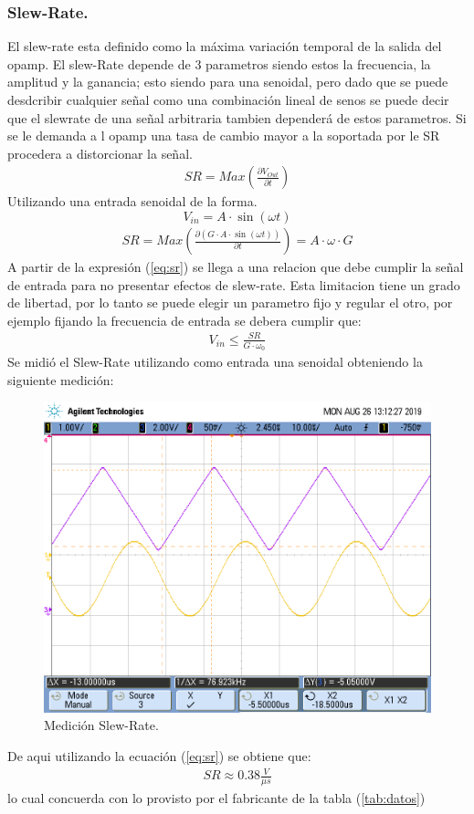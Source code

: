 \subsubsection{Slew-Rate.}
El slew-rate esta definido como la máxima variación temporal de la salida del opamp. El slew-Rate depende de 3 parametros siendo estos la frecuencia, la amplitud y la ganancia; esto siendo para una senoidal, pero dado que se puede desdcribir cualquier señal como una combinación lineal de senos se puede decir que el slewrate de una señal arbitraria tambien dependerá de estos parametros.
Si se le demanda a l opamp una tasa de cambio mayor a la soportada por le SR procedera a distorcionar la señal.
\begin{align}  SR= Max\left( \frac{\partial V_{Out}}{\partial t}\right)  \end{align}
Utilizando una entrada senoidal de la forma.
$$V_{in}=A\cdot \sin (\omega t)$$
\begin{align}   SR= Max\left( \frac{\partial (G\cdot A\cdot \sin (\omega t))}{\partial t}\right) = A \cdot \omega \cdot G  
\label{eq:sr}
\end{align}
A partir de la expresión  (\ref{eq:sr}) se llega a una relacion que debe cumplir la señal de entrada para no presentar efectos de slew-rate. Esta limitacion tiene un grado de libertad, por lo tanto se puede elegir un parametro fijo y regular el otro, por ejemplo fijando la frecuencia de entrada se debera cumplir que:
\begin{align} V_{in}	\leq \frac{SR}{G\cdot \omega_0}\end{align}
Se midió el Slew-Rate  utilizando como entrada una senoidal obteniendo la siguiente medición:
\begin{figure}[H]	
	\centering
	\includegraphics[width=\textwidth]{Ejercicio1/Imagenes/slew_rate1.png}
	\caption{Medición Slew-Rate.}
	\label{fig:SlewRate}
\end{figure}
De aqui utilizando la ecuación (\ref{eq:sr}) se obtiene que:
\begin{align}
SR \approx  0.38 \frac{V}{\mu s}
\end{align}
lo cual concuerda con lo provisto por el fabricante de la tabla (\ref{tab:datos})
